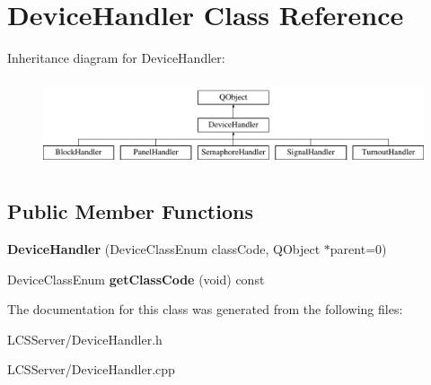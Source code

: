 \hypertarget{class_device_handler}{}\section{Device\+Handler Class Reference}
\label{class_device_handler}
Inheritance diagram for Device\+Handler\+:\begin{figure}[H]
\begin{center}
\leavevmode
\includegraphics[height=2.604651cm]{class_device_handler}
\end{center}
\end{figure}
\subsection*{Public Member Functions}
\begin{DoxyCompactItemize}
\item 
\mbox{\label{class_device_handler_ab16ab4b34974a0f4047851210e4825a7}} 
{\bfseries Device\+Handler} (Device\+Class\+Enum class\+Code, Q\+Object $\ast$parent=0)
\item 
\mbox{\label{class_device_handler_a117ebae8784b275f5dfc8bcf0b32f662}} 
Device\+Class\+Enum {\bfseries get\+Class\+Code} (void) const
\end{DoxyCompactItemize}


The documentation for this class was generated from the following files\+:\begin{DoxyCompactItemize}
\item 
L\+C\+S\+Server/Device\+Handler.\+h\item 
L\+C\+S\+Server/Device\+Handler.\+cpp\end{DoxyCompactItemize}
